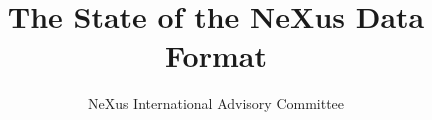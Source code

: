 \begin{frontmatter}




\title{The State of the NeXus Data Format}

%
%
%
%
%
%

\author{NeXus International Advisory Committee}

%
 
\address{}

%
%
%
%


%
%
%
%


\end{frontmatter}
